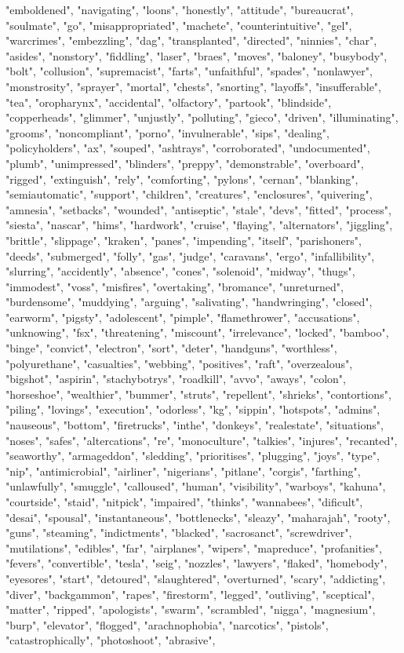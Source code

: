 "emboldened", "navigating", "loons", "honestly", "attitude", "bureaucrat", "soulmate", "go", "misappropriated", "machete", "counterintuitive", "gel", "warcrimes", "embezzling", "dag", "transplanted", "directed", "ninnies", "char", "asides", "nonstory", "fiddling", "laser", "braes", "moves", "baloney", "busybody", "bolt", "collusion", "supremacist", "farts", "unfaithful", "spades", "nonlawyer", "monstrosity", "sprayer", "mortal", "chests", "snorting", "layoffs", "insufferable", "tea", "oropharynx", "accidental", "olfactory", "partook", "blindside", "copperheads", "glimmer", "unjustly", "polluting", "gieco", "driven", "illuminating", "grooms", "noncompliant", "porno", "invulnerable", "sips", "dealing", "policyholders", "ax", "souped", "ashtrays", "corroborated", "undocumented", "plumb", "unimpressed", "blinders", "preppy", "demonstrable", "overboard", "rigged", "extinguish", "rely", "comforting", "pylons", "cernan", "blanking", "semiautomatic", "support", "children", "creatures", "enclosures", "quivering", "amnesia", "setbacks", "wounded", "antiseptic", "stale", "devs", "fitted", "process", "siesta", "nascar", "hims", "hardwork", "cruise", "flaying", "alternators", "jiggling", "brittle", "slippage", "kraken", "panes", "impending", "itself", "parishoners", "deeds", "submerged", "folly", "gas", "judge", "caravans", "ergo", "infallibility", "slurring", "accidently", "absence", "cones", "solenoid", "midway", "thugs", "immodest", "voss", "misfires", "overtaking", "bromance", "unreturned", "burdensome", "muddying", "arguing", "salivating", "handwringing", "closed", "earworm", "pigsty", "adolescent", "pimple", "flamethrower", "accusations", "unknowing", "fsx", "threatening", "miscount", "irrelevance", "locked", "bamboo", "binge", "convict", "electron", "sort", "deter", "handguns", "worthless", "polyurethane", "casualties", "webbing", "positives", "raft", "overzealous", "bigshot", "aspirin", "stachybotrys", "roadkill", "avvo", "aways", "colon", "horseshoe", "wealthier", "bummer", "struts", "repellent", "shrieks", "contortions", "piling", "lovings", "execution", "odorless", "kg", "sippin", "hotspots", "admins", "nauseous", "bottom", "firetrucks", "inthe", "donkeys", "realestate", "situations", "noses", "safes", "altercations", "re", "monoculture", "talkies", "injures", "recanted", "seaworthy", "armageddon", "sledding", "prioritises", "plugging", "joys", "type", "nip", "antimicrobial", "airliner", "nigerians", "pitlane", "corgis", "farthing", "unlawfully", "smuggle", "calloused", "human", "visibility", "warboys", "kahuna", "courtside", "staid", "nitpick", "impaired", "thinks", "wannabees", "dificult", "desai", "spousal", "instantaneous", "bottlenecks", "sleazy", "maharajah", "rooty", "guns", "steaming", "indictments", "blacked", "sacrosanct", "screwdriver", "mutilations", "edibles", "far", "airplanes", "wipers", "mapreduce", "profanities", "fevers", "convertible", "tesla", "seig", "nozzles", "lawyers", "flaked", "homebody", "eyesores", "start", "detoured", "slaughtered", "overturned", "scary", "addicting", "diver", "backgammon", "rapes", "firestorm", "legged", "outliving", "sceptical", "matter", "ripped", "apologists", "swarm", "scrambled", "nigga", "magnesium", "burp", "elevator", "flogged", "arachnophobia", "narcotics", "pistols", "catastrophically", "photoshoot", "abrasive", 